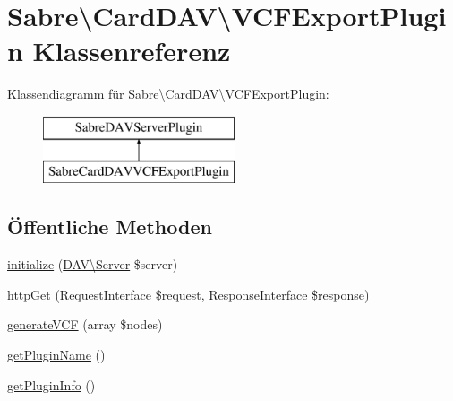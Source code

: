 \hypertarget{class_sabre_1_1_card_d_a_v_1_1_v_c_f_export_plugin}{}\section{Sabre\textbackslash{}Card\+D\+AV\textbackslash{}V\+C\+F\+Export\+Plugin Klassenreferenz}
\label{class_sabre_1_1_card_d_a_v_1_1_v_c_f_export_plugin}
Klassendiagramm für Sabre\textbackslash{}Card\+D\+AV\textbackslash{}V\+C\+F\+Export\+Plugin\+:\begin{figure}[H]
\begin{center}
\leavevmode
\includegraphics[height=2.000000cm]{class_sabre_1_1_card_d_a_v_1_1_v_c_f_export_plugin}
\end{center}
\end{figure}
\subsection*{Öffentliche Methoden}
\begin{DoxyCompactItemize}
\item 
\mbox{\hyperlink{class_sabre_1_1_card_d_a_v_1_1_v_c_f_export_plugin_a5ff4a2ed1d11c23aaa03535c40dceeff}{initialize}} (\mbox{\hyperlink{class_sabre_1_1_d_a_v_1_1_server}{D\+A\+V\textbackslash{}\+Server}} \$server)
\item 
\mbox{\hyperlink{class_sabre_1_1_card_d_a_v_1_1_v_c_f_export_plugin_ae177b83aabedab3b79efd4272dfe42bc}{http\+Get}} (\mbox{\hyperlink{interface_sabre_1_1_h_t_t_p_1_1_request_interface}{Request\+Interface}} \$request, \mbox{\hyperlink{interface_sabre_1_1_h_t_t_p_1_1_response_interface}{Response\+Interface}} \$response)
\item 
\mbox{\hyperlink{class_sabre_1_1_card_d_a_v_1_1_v_c_f_export_plugin_a9fdbf212e5f7b5a73803f21f8f26ab2d}{generate\+V\+CF}} (array \$nodes)
\item 
\mbox{\hyperlink{class_sabre_1_1_card_d_a_v_1_1_v_c_f_export_plugin_ac8c76a8b670ae37a73679c03a8009b74}{get\+Plugin\+Name}} ()
\item 
\mbox{\hyperlink{class_sabre_1_1_card_d_a_v_1_1_v_c_f_export_plugin_ae5624d8d7cdd02424e6b128fc6545361}{get\+Plugin\+Info}} ()
\end{DoxyCompactItemize}
